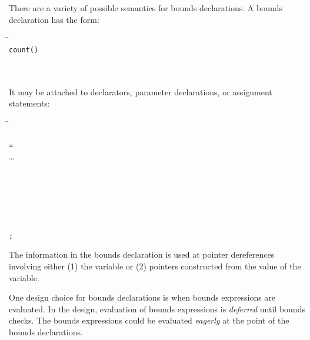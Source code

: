 There are a variety of possible semantics for
bounds declarations. A bounds declaration has the form:

\begin{quote}
\end{quote}

\begin{tabbing}
\= \\
\> \texttt{count(}\texttt{)} \\
\>  \\
\> \boundsnone \\
\> \boundsany
\end{tabbing}

It may be attached to declarators, parameter declarations, or assignment statements:

\begin{tabbing}
\= \\
\> \\
\> \texttt{=}  \\
\>\ldots{} \\
\\
 \\
\> \\
\> \\
\\
\\
\>\texttt{;}
\end{tabbing}

The information in the bounds declaration is used at pointer
dereferences involving either (1) the variable or (2) pointers
constructed from the value of the variable.

One design choice for bounds declarations is when
bounds expressions are evaluated.  In the design, evaluation of
bounds expressions is {\em deferred} until bounds checks.  The bounds
expressions could be evaluated {\em eagerly} at the point of the bounds declarations.

